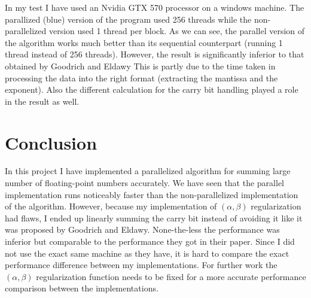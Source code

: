\documentclass[11pt]{article}       %
\begin{document}
In my test I have used an Nvidia GTX 570 processor on a windows machine. The parallized (blue) version of the program used 256 threads while the non-parallelized version used 1 thread per block. As we can see, the parallel version of the algorithm works much better than its sequential counterpart (running 1 thread instead of 256 threads). However, the result is significantly inferior to that obtained by Goodrich and Eldawy This is partly due to the time taken in processing the data into the right format (extracting the mantissa and the exponent). Also the different calculation for the carry bit handling played a role in the result as well.


\section{Conclusion} \label{concl}

In this project I have implemented a parallelized algorithm for summing large number of floating-point numbers accurately. We have seen that the parallel implementation runs noticeably faster than the non-parallelized implementation of the algorithm. However, because my implementation of $(\alpha, \beta)$ regularization had flaws, I ended up linearly summing the carry bit instead of avoiding it like it was proposed by Goodrich and Eldawy. None-the-less the performance was inferior but comparable to the performance they got in their paper. Since I did not use the exact same machine as they have, it is hard to compare the exact performance difference between my implementations. For further work the $(\alpha, \beta)$ regularization function needs to be fixed for a more accurate performance comparison between the implementations.



\end{document}
